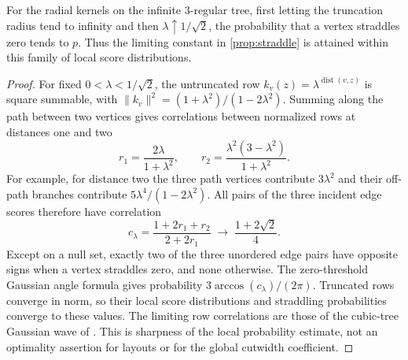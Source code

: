 \documentclass[11pt]{article}
\theoremstyle{plain}
\theoremstyle{definition}
\theoremstyle{remark}
\begin{document}
\begin{proposition}
\label{prop:tree-sharpness}
For the radial kernels on the infinite $3$-regular tree, first letting the truncation radius
tend to infinity and then $\lambda\uparrow1/\sqrt2$, the probability that a vertex straddles
zero tends to $p$. Thus the limiting constant in \cref{prop:straddle} is attained within this
family of local score distributions.
\end{proposition}

\begin{proof}
For fixed $0<\lambda<1/\sqrt2$, the untruncated row $k_v(z)=\lambda^{\operatorname{dist}(v,z)}$
is square summable, with
$\|k_v\|^2=(1+\lambda^2)/(1-2\lambda^2)$. Summing along the path between two vertices gives
correlations between normalized rows at distances one and two
\[
  r_1=\frac{2\lambda}{1+\lambda^2},\qquad
  r_2=\frac{\lambda^2(3-\lambda^2)}{1+\lambda^2}.
\]
For example, for distance two the three path vertices contribute $3\lambda^2$ and their
off-path branches contribute $5\lambda^4/(1-2\lambda^2)$. All pairs of the three incident
edge scores therefore have correlation
\[
  c_\lambda=\frac{1+2r_1+r_2}{2+2r_1}
  \;\longrightarrow\;\frac{1+2\sqrt2}{4}.
\]
Except on a null set, exactly two of the three unordered edge pairs have opposite signs
when a vertex straddles zero, and none otherwise. The zero-threshold Gaussian angle formula
gives probability $3\arccos(c_\lambda)/(2\pi)$. Truncated rows converge in norm, so their
local score distributions and straddling probabilities converge to these values. The
limiting row correlations are those of the cubic-tree Gaussian wave
of \cite{CGHV2015,Lyons2017}. This is sharpness of the local probability estimate, not an
optimality assertion for layouts or for the global cutwidth coefficient.
\end{proof}
\end{document}
